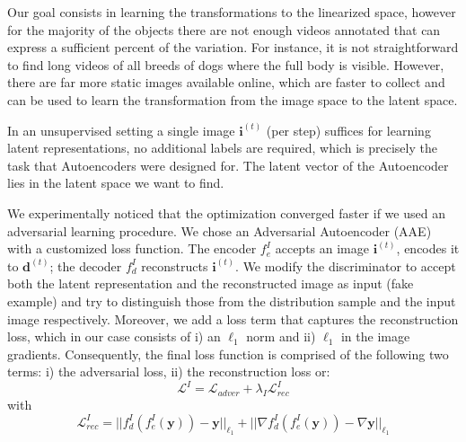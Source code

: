 \documentclass[10pt,twocolumn,letterpaper]{article}
\begin{document}
Our goal consists in learning the transformations to the linearized space, however for the majority of the objects there are not enough videos annotated that can express a sufficient percent of the variation. For instance, it is not straightforward to find long videos of all breeds of dogs where the full body is visible. However, there are far more static images available online, which are faster to collect and can be used to learn the transformation from the image space to the latent space. 


In an unsupervised setting a single image $\bm{i}^{(t)}$ (per step) suffices for learning latent representations, no additional labels are required, which is precisely the task that Autoencoders were designed for. The latent vector of the Autoencoder lies in the latent space we want to find.

We experimentally noticed that the optimization converged faster if we used an adversarial learning procedure. We chose an Adversarial Autoencoder (AAE)~\cite{makhzani2015adversarial} with a customized loss function. The encoder $f_e^{I}$ accepts an image $\bm{i}^{(t)}$, encodes it to $\bm{d}^{(t)}$; the decoder $f_d^{I}$ reconstructs $\bm{i}^{(t)}$. We modify the discriminator to accept both the latent representation and the reconstructed image as input (fake example) and try to distinguish those from the distribution sample and the input image respectively. Moreover, we add a loss term that captures the reconstruction loss, which in our case consists of i) an $\ell_1$ norm and ii) $\ell_1$ in the image gradients.
Consequently, the final loss function is comprised of the following two terms: i) the adversarial loss, ii) the reconstruction loss or:
\begin{equation}
    \mathcal{L}^{I} = \mathcal{L}_{adver} + \lambda_{I} \mathcal{L}_{rec}^{I}
\end{equation}
with
\begin{equation}
    \mathcal{L}_{rec}^{I} = ||f_d^{I}(f_e^{I}(\bm{y})) - \bm{y}||_{\ell_1} + ||\nabla f_d^{I}(f_e^{I}(\bm{y})) - \nabla \bm{y}||_{\ell_1}
    \label{eq:linear_dynamics_stageI_recloss}
\end{equation}
\end{document}
